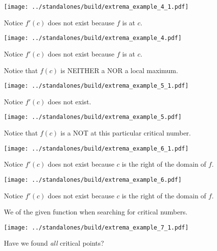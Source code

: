 \documentclass[12pt, handout]{beamer}
\begin{document}
\begin{frame}[t]
  \texttt{[image: ../standalones/build/extrema\_example\_4\_1.pdf]}

  Notice \(f'(c)\) does not exist because \(f\) is  at \(c\). 
\end{frame}

\begin{frame}[t]
  \texttt{[image: ../standalones/build/extrema\_example\_4.pdf]}
  
  Notice \(f'(c)\) does not exist because \(f\) is  at \(c\). 
  \pause 

  Notice that \(f(c)\) is NEITHER a  NOR a local maximum.
\end{frame}


\begin{frame}[t]
  \texttt{[image: ../standalones/build/extrema\_example\_5\_1.pdf]}

  Notice \(f'(c)\) does not exist.
\end{frame}

\begin{frame}[t]
  \texttt{[image: ../standalones/build/extrema\_example\_5.pdf]}
  
  \pause 
  Notice that \(f(c)\) is a NOT  at this particular critical number.
\end{frame}


\begin{frame}[t]
  \texttt{[image: ../standalones/build/extrema\_example\_6\_1.pdf]}

  Notice \(f'(c)\) does not exist because \(c\) is the right  of the domain of \(f\).
\end{frame}

\begin{frame}[t]
  \texttt{[image: ../standalones/build/extrema\_example\_6.pdf]}
  
  Notice \(f'(c)\) does not exist because \(c\) is the right  of the domain of \(f\).

  \pause        
  \hlwarn{\faExclamationTriangle{}} We  of the given function when searching for critical numbers.
\end{frame}



\begin{frame}[t]
  \texttt{[image: ../standalones/build/extrema\_example\_7\_1.pdf]}
  
  \faComment{} Have we found \emph{all} critical points?
\end{frame}
\end{document}
